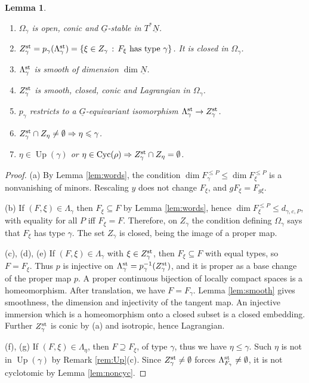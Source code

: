 \documentclass[11pt,reqno]{amsart}
\newtheorem{Lemma}[Theorem]{Lemma}
\theoremstyle{definition}
\theoremstyle{remark}
\def\dN{\underline N}
\def\dG{\underline G}
\def\Up{\operatorname{Up}}
\def\Cyc{\operatorname{Cyc}}
\begin{document}
\begin{Lemma}\label{lem:Z}\hfill
\begin{enumerate}[label=$\mathrm{(\alph*)}$,leftmargin=8mm,itemsep=1mm]
\item $\Omega_\gamma$ is open, conic and $\dG$-stable in $T^*\dN$.
\item $Z^{\rm st}_\gamma=p_\gamma(\Lambda^{\rm st}_\gamma)=\{\xi\in Z_\gamma\,:\,F_\xi\text{ has type }\gamma\}$.
It is closed in $\Omega_\gamma$.
\item 
$\Lambda^{\rm st}_\gamma$ is smooth of dimension $\dim\dN$.
\item
$Z^{\rm st}_\gamma$ is smooth, closed, conic and Lagrangian in $\Omega_\gamma$.
\item
$p_\gamma$ restricts to
a $\dG$-equivariant isomorphism $\Lambda^{\rm st}_\gamma\to Z^{\rm st}_\gamma$.
\item $Z^{\rm st}_\gamma\cap Z_\eta\neq\emptyset\Rightarrow\eta\leqslant\gamma$. 
\item
$\eta\in\Up(\gamma)$ or $\eta\in\Cyc(\rho)\Rightarrow Z^{\rm st}_\gamma\cap Z_\eta=\emptyset$. 
\end{enumerate}
\end{Lemma}

\begin{proof}\hfill

(a) By Lemma \ref{lem:words}, the condition $\dim F_\gamma^{\leqslant P}\leqslant \dim F_\xi^{\leqslant P}$ is a nonvanishing of minors. 
Rescaling $y$ does not change $F_\xi$, and $gF_\xi=F_{g\xi}$. 

(b) If $(F,\xi)\in\Lambda_\gamma$ then $F_\xi\subseteq F$ by Lemma \ref{lem:words}, hence $\dim F_\xi^{\leqslant P}\leqslant d_{\gamma,c,P}$, with
equality for all $P$ iff $F_\xi=F$. 
Therefore, on $Z_\gamma$ the condition defining $\Omega_\gamma$ says that $F_\xi$ has type $\gamma$. 
The set $Z_\gamma$ is closed,
being the image of a proper map. 

(c), (d), (e) If $(F,\xi)\in\Lambda_\gamma$ with $\xi\in Z^{\rm st}_\gamma$, then $F_\xi\subseteq F$ with equal types, so $F=F_\xi$.
Thus $p$ is injective on $\Lambda^{\rm st}_\gamma=p_\gamma^{-1}(Z^{\rm st}_\gamma)$, 
and it is proper as a base change of the proper map $p$. 
A proper continuous bijection of locally compact spaces is a homeomorphism. 
After translation, we have $F=F_\gamma$. Lemma \ref{lem:smooth} gives smoothness,
the dimension and injectivity of the tangent map. An injective immersion which is a homeomorphism onto a closed subset is a
closed embedding. Further $Z^{\rm st}_\gamma$ is conic by (a) and isotropic, hence Lagrangian. 

(f), (g) If $(F,\xi)\in\Lambda_\eta$, then $F\supseteq F_\xi$, of
type $\gamma$, thus we have  $\eta\leqslant\gamma$.
Such $\eta$ is not in $\Up(\gamma)$ by Remark \ref{rem:Up}(c).
Since $Z^{\rm st}_\gamma\neq\emptyset$ forces
$\Lambda^{\rm st}_{F_\gamma}\neq\emptyset$, it is not cyclotomic by Lemma \ref{lem:noncyc}.
\end{proof}
\end{document}

